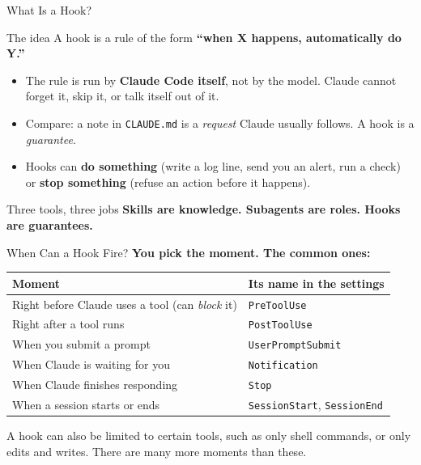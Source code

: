 \documentclass[aspectratio=169, 11pt]{beamer}
\begin{document}

\begin{frame}{What Is a Hook?}
  \begin{block}{The idea}
    A hook is a rule of the form \textbf{``when X happens, automatically do Y.''}
  \end{block}

  \vspace{0.5em}
  \begin{itemize}
    \item The rule is run by \textbf{Claude Code itself}, not by the model. Claude cannot forget it, skip it, or talk itself out of it.
    \item Compare: a note in \texttt{CLAUDE.md} is a \emph{request} Claude usually follows. A hook is a \emph{guarantee}.
    \item Hooks can \textbf{do something} (write a log line, send you an alert, run a check) or \textbf{stop something} (refuse an action before it happens).
  \end{itemize}

  \vspace{0.6em}
  \begin{block}{Three tools, three jobs}
    \textbf{Skills are knowledge. Subagents are roles. Hooks are guarantees.}
  \end{block}
\end{frame}

\begin{frame}{When Can a Hook Fire?}
  \textbf{You pick the moment. The common ones:}

  \vspace{0.4em}
  \small
  \renewcommand{\arraystretch}{1.25}
  \begin{tabular}{@{}L{0.46\textwidth}L{0.46\textwidth}@{}}
    \toprule
    \textbf{Moment} & \textbf{Its name in the settings} \\
    \midrule
    Right before Claude uses a tool (can \emph{block} it) & \texttt{PreToolUse} \\
    Right after a tool runs & \texttt{PostToolUse} \\
    When you submit a prompt & \texttt{UserPromptSubmit} \\
    When Claude is waiting for you & \texttt{Notification} \\
    When Claude finishes responding & \texttt{Stop} \\
    When a session starts or ends & \texttt{SessionStart}, \texttt{SessionEnd} \\
    \bottomrule
  \end{tabular}

  \vspace{0.6em}
  \normalsize
  A hook can also be limited to certain tools, such as only shell commands, or only edits and writes. There are many more moments than these.
\end{frame}
\end{document}
